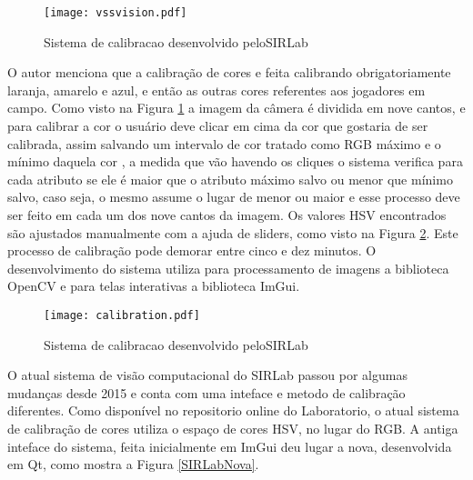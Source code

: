 \begin{figure}[H]
	\centering
	\texttt{[image: vssvision.pdf]} 	
	\caption{Sistema de calibracao desenvolvido peloSIRLab \cite{Rosa:2015}}
	\label{SIRLabCalibracao}
\end{figure}
O autor menciona que a calibração de cores e feita calibrando obrigatoriamente laranja, amarelo e azul, e então as outras cores referentes aos jogadores em campo. Como visto na Figura \ref{SIRLabCalibracao} a imagem da c\^amera é dividida em nove cantos, e para calibrar a cor o usuário deve clicar em cima da cor que gostaria de ser calibrada, assim salvando um intervalo de cor tratado como RGB máximo e o mínimo daquela cor , a medida
que vão havendo os cliques o sistema verifica para cada atributo se ele é maior que o atributo
máximo salvo ou menor que mínimo salvo, caso seja, o mesmo assume o lugar de menor ou
maior\cite{Rosa:2015} e esse processo deve ser feito em cada um dos nove cantos da imagem. Os valores HSV encontrados s\~ao ajustados manualmente com a ajuda de sliders, como visto na Figura \ref{SIRLabCalibracaoHSV}. Este processo de calibração pode demorar entre cinco e dez minutos.
O desenvolvimento do sistema utiliza para processamento de imagens a biblioteca OpenCV e para telas interativas a biblioteca  ImGui.

\begin{figure}[!h]
	\centering
	\texttt{[image: calibration.pdf]} 	
	\caption{Sistema de calibracao desenvolvido peloSIRLab \cite{VSSVision}}
	\label{SIRLabCalibracaoHSV}
\end{figure}

O atual sistema de visão computacional do SIRLab passou por algumas mudanças desde 2015 e conta com uma inteface e metodo de calibração diferentes\cite{VSSVision}. 
Como disponível no repositorio online do Laboratorio, o atual sistema de calibração de cores utiliza o espaço de cores HSV, no lugar do RGB\cite{Rosa:2015}. A antiga inteface do sistema, feita inicialmente em ImGui deu lugar a nova, desenvolvida em Qt, como mostra a Figura \ref{SIRLabNova}.
\


